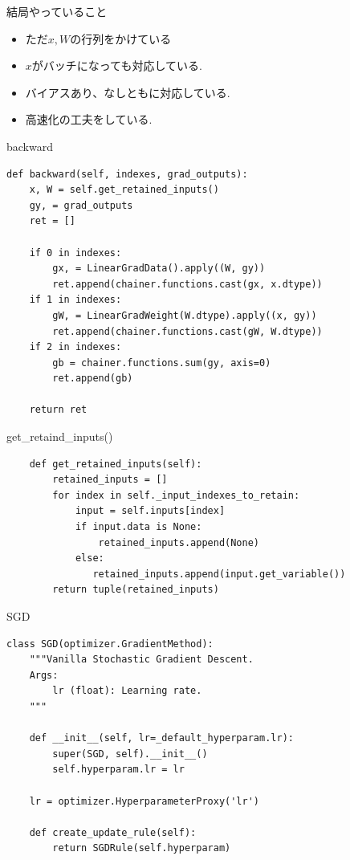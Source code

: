 \begin{frame}[fragile]{結局やっていること}
\begin{itemize}
\item ただ$x, W$の行列をかけている
\item $x$がバッチになっても対応している.
\item バイアスあり、なしともに対応している.
\item 高速化の工夫をしている.
\end{itemize}


\end{frame}
\begin{frame}[fragile]{backward}
\begin{verbatim}
def backward(self, indexes, grad_outputs):
    x, W = self.get_retained_inputs()
    gy, = grad_outputs
    ret = []
    
    if 0 in indexes:
        gx, = LinearGradData().apply((W, gy))
        ret.append(chainer.functions.cast(gx, x.dtype))
    if 1 in indexes:
        gW, = LinearGradWeight(W.dtype).apply((x, gy))
        ret.append(chainer.functions.cast(gW, W.dtype))
    if 2 in indexes:
        gb = chainer.functions.sum(gy, axis=0)
        ret.append(gb)

    return ret
\end{verbatim}

\end{frame}


\begin{frame}[fragile]{get\_retaind\_inputs()}
\begin{verbatim}
    def get_retained_inputs(self):
        retained_inputs = []
        for index in self._input_indexes_to_retain:
            input = self.inputs[index]
            if input.data is None:
                retained_inputs.append(None)
            else:
               retained_inputs.append(input.get_variable())
        return tuple(retained_inputs)
\end{verbatim}
\end{frame}


\begin{frame}[fragile]{SGD}
\begin{verbatim}
class SGD(optimizer.GradientMethod):
    """Vanilla Stochastic Gradient Descent.
    Args:
        lr (float): Learning rate.
    """

    def __init__(self, lr=_default_hyperparam.lr):
        super(SGD, self).__init__()
        self.hyperparam.lr = lr

    lr = optimizer.HyperparameterProxy('lr')

    def create_update_rule(self):
        return SGDRule(self.hyperparam)
\end{verbatim}
\end{frame}


